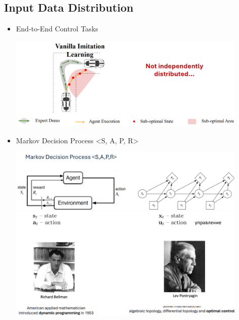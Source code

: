 \documentclass[10pt]{article}
\begin{document}
\subsection*{Input Data Distribution}
\begin{itemize}
	\item End-to-End Control Tasks
	\begin{center}
        \includegraphics*[width=0.9\textwidth]{L2_5.png}
    \end{center}
    \item Markov Decision Process <S, A, P, R>
    \begin{center}
        \includegraphics*[width=0.9\textwidth]{L2_6.png} \\
        \includegraphics*[width=0.9\textwidth]{L2_7.png} \\
    \end{center}
\end{itemize}
\end{document}
